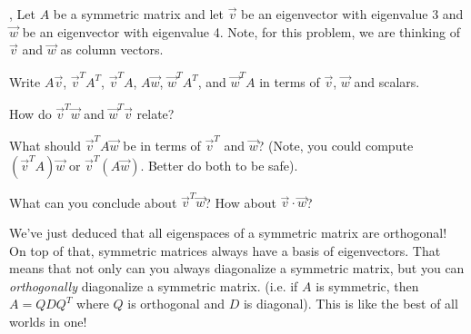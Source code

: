 \documentclass[letter]{article}
\begin{document}
	\sep
	Let $A$ be a symmetric matrix and let $\vec v$ be an eigenvector with eigenvalue
	3 and $\vec w$ be an eigenvector with eigenvalue 4.  Note, for this problem,
	we are thinking of $\vec v$ and $\vec w$ as column vectors.
	\begin{Enum}
		\item Write $A\vec v$, $\vec v^TA^T$, $\vec v^TA$, $A\vec w$, $\vec w^TA^T$, 
		and $\vec w^TA$ in terms of $\vec v$, $\vec w$ and scalars.
		\item How do $\vec v^T\vec w$ and $\vec w^T\vec v$ relate?
		\item What should $\vec v^TA\vec w$ be in terms of $\vec v^T$ and
			$\vec w$? (Note, you could compute $(\vec v^TA)\vec w$
			or $\vec v^T(A\vec w)$.  Better do both to be safe).
		\item What can you conclude about $\vec v^T\vec w$?  How about
			$\vec v\cdot \vec w$?
	\end{Enum}

	We've just deduced that all eigenspaces of a symmetric matrix are orthogonal! On
	top of that, symmetric matrices always have a basis of eigenvectors.  That means
	that not only can you always diagonalize a symmetric matrix, but you can 
	\emph{orthogonally} diagonalize a symmetric matrix. (i.e. if $A$ is symmetric,
	then $A=QDQ^T$ where $Q$ is orthogonal and $D$ is diagonal).  This is like the 
	best of all worlds in one!
\end{document}
